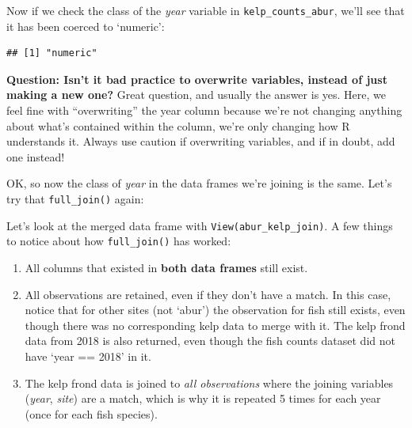 \documentclass[]{book}
\newenvironment{Shaded}{\begin{snugshade}}{\end{snugshade}}
\newcommand{\DataTypeTok}[1]{\textcolor[rgb]{0.13,0.29,0.53}{#1}}
\newcommand{\DecValTok}[1]{\textcolor[rgb]{0.00,0.00,0.81}{#1}}
\newcommand{\KeywordTok}[1]{\textcolor[rgb]{0.13,0.29,0.53}{\textbf{#1}}}
\newcommand{\NormalTok}[1]{#1}
\newcommand{\OperatorTok}[1]{\textcolor[rgb]{0.81,0.36,0.00}{\textbf{#1}}}
\newcommand{\StringTok}[1]{\textcolor[rgb]{0.31,0.60,0.02}{#1}}
\providecommand{\tightlist}{%
  \setlength{\itemsep}{0pt}\setlength{\parskip}{0pt}}
\begin{document}
Now if we check the class of the \emph{year} variable in \texttt{kelp\_counts\_abur}, we'll see that it has been coerced to `numeric':

\begin{Shaded}
\end{Shaded}

\begin{verbatim}
## [1] "numeric"
\end{verbatim}

\textbf{Question: Isn't it bad practice to overwrite variables, instead of just making a new one?} Great question, and usually the answer is yes. Here, we feel fine with ``overwriting'' the year column because we're not changing anything about what's contained within the column, we're only changing how R understands it. Always use caution if overwriting variables, and if in doubt, add one instead!

OK, so now the class of \emph{year} in the data frames we're joining is the same. Let's try that \texttt{full\_join()} again:

\begin{Shaded}
\end{Shaded}

Let's look at the merged data frame with \texttt{View(abur\_kelp\_join)}. A few things to notice about how \texttt{full\_join()} has worked:

\begin{enumerate}
\def\labelenumi{\arabic{enumi}.}
\tightlist
\item
  All columns that existed in \textbf{both data frames} still exist.
\item
  All observations are retained, even if they don't have a match. In this case, notice that for other sites (not `abur') the observation for fish still exists, even though there was no corresponding kelp data to merge with it. The kelp frond data from 2018 is also returned, even though the fish counts dataset did not have `year == 2018' in it.
\item
  The kelp frond data is joined to \emph{all observations} where the joining variables (\emph{year}, \emph{site}) are a match, which is why it is repeated 5 times for each year (once for each fish species).
\end{enumerate}
\end{document}
